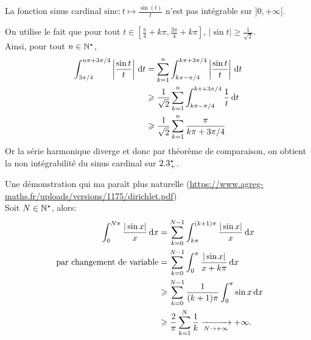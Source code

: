 \begin{tcolorbox}
    La fonction sinus cardinal $\mathrm{sinc}:t \mapsto \frac{\sin(t)}{t}$ n'est pas intégrable sur $]0, +\infty[$.
\end{tcolorbox}

\begin{marginfigure}[-2.5cm]
    
\end{marginfigure}

\begin{preuve}
    On utilise le fait que pour tout $t \in \left[ \frac{\pi}{4} + k\pi, \frac{3 \pi}{4} + k \pi \right]$, $|\sin t| \geqslant \frac{1}{\sqrt{2}}$. \\
    Ainsi, pour tout $n \in \mathbb{N}^\star$,
    \begin{align*}
        \int_{3 \pi / 4}^{n \pi + 3 \pi / 4} \left| \frac{\sin t}{t} \right| \, \mathrm{d} t &= \sum_{k=1}^n \int_{k \pi - \pi/4}^{k \pi + 3 \pi/4} \left| \frac{\sin t}{t} \right| \, \mathrm{d} t \\
        &\geqslant \frac{1}{\sqrt{2}} \sum_{k=1}^{n} \int_{k \pi - \pi/4}^{k \pi + 3 \pi/4} \frac{1}{t} \, \mathrm{d} t \\
        &\geqslant \frac{1}{\sqrt{2}} \sum_{k=1}^n \frac{\pi}{k \pi + 3 \pi/4} \\
    \end{align*}
    Or la série harmonique diverge et donc par théorème de comparaison, on obtient la non intégrabilité du sinus cardinal sur $2.3^\star_+$.
\end{preuve}

\begin{preuve}
    Une démonstration qui ma paraît plus naturelle (\url{https://www.agreg-maths.fr/uploads/versions/1175/dirichlet.pdf}) \\
    Soit $N \in \mathbb{N}^\star$, alors:
    \begin{align*}
        \int_0^{N \pi} \frac{|\sin x|}{x} \, \mathrm{d} x &= \sum_{k=0}^{N-1} \int_{k \pi}^{(k+1) \pi} \frac{|\sin x|}{x} \, \mathrm{d} x \\
        \text{ par changement de variable} &= \sum_{k=0}^{N-1} \int_0^\pi \frac{|\sin x|}{x + k \pi} \, \mathrm{d} x \\
        &\geqslant \sum_{k=0}^{N-1} \frac{1}{(k+1) \pi} \int_0^\pi \sin x \, \mathrm{d} x \\
        &\geqslant \frac{2}{\pi} \sum_{k=1}^N \frac{1}{k} \xrightarrow[N \to + \infty]{} + \infty.
    \end{align*}
\end{preuve}